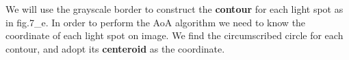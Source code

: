 \documentclass[conference]{IEEEtran}
\begin{document}
We will use the grayscale border to construct the \textbf{contour} for each light spot as in fig.7\_e. In order to perform the AoA algorithm we need to know the coordinate of each light spot on image. We find the circumscribed circle for each contour, and adopt its \textbf{centeroid} as the coordinate.

\begin{figure} \centering
\end{figure}
\end{document}
